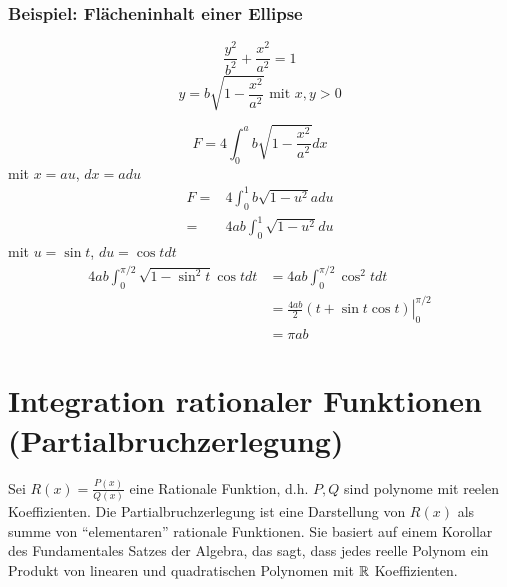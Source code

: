 \begin{enumerate}
\subsubsection*{Beispiel: Flächeninhalt einer Ellipse}

\begin{figure}[ht]
\begin{minipage}[b]{0.45\linewidth}
\centering
{}

\end{minipage}
\hspace{0.5cm}
\begin{minipage}[b]{0.45\linewidth}

\centering
\[\frac{y^2}{b^2}+\frac{x^2}{a^2}=1\]
\[y=b\sqrt{1-\frac{x^2}{a^2}}\text{ mit }x,y>0\]

\end{minipage}
\end{figure}
\[F=4\int ^{a}_{0}b\sqrt {1-\dfrac {x^{2}}{a^{2}}}dx\]
mit $x=au$, $dx=adu$ 
\begin{align*}
F=&4\int ^{1}_{0}b\sqrt {1-u^2}adu\\
=&4ab\int ^{1}_{0}\sqrt {1-u^2}du
\end{align*}
mit $u=\sin t$, $du=\cos tdt$
\begin{align*}
4ab\int ^{\pi /2}_{0}\sqrt {1-\sin^2t}\cos t dt &=4ab\int ^{\pi /2}_{0}\cos ^{2}tdt\\
&=\left.\frac{4ab}{2}\left( t+\sin t\cos t\right) \right| ^{\pi /2}_{0}\\
&=\pi ab
\end{align*}
\end{enumerate}  



\section{Integration rationaler Funktionen (Partialbruchzerlegung)}
Sei $R(x)=\frac{P(x)}{Q(x)}$ eine Rationale Funktion, d.h. $P,Q$ sind polynome mit reelen Koeffizienten. Die Partialbruchzerlegung ist eine Darstellung von $R(x)$ als summe von ``elementaren'' rationale Funktionen. Sie basiert auf einem Korollar des Fundamentales Satzes der Algebra, das sagt, dass jedes reelle Polynom ein Produkt von linearen und quadratischen Polynomen mit $\mathbb{R}$ Koeffizienten. 

